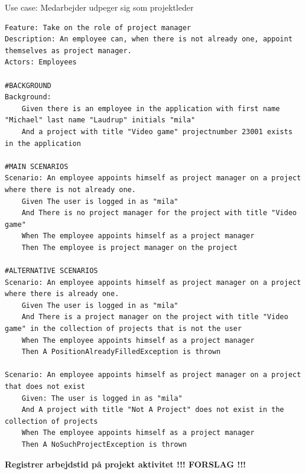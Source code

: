 \begin{listing}[H]
    \centering
    \caption{Use case: Medarbejder udpeger sig som projektleder} \label{lst:usecase_bliv_projektleder}
    \begin{verbatim}  
Feature: Take on the role of project manager
Description: An employee can, when there is not already one, appoint themselves as project manager.
Actors: Employees

#BACKGROUND
Background:
    Given there is an employee in the application with first name "Michael" last name "Laudrup" initials "mila"
    And a project with title "Video game" projectnumber 23001 exists in the application

#MAIN SCENARIOS
Scenario: An employee appoints himself as project manager on a project where there is not already one.
    Given The user is logged in as "mila"
    And There is no project manager for the project with title "Video game"
    When The employee appoints himself as a project manager
    Then The employee is project manager on the project

#ALTERNATIVE SCENARIOS
Scenario: An employee appoints himself as project manager on a project where there is already one.
    Given The user is logged in as "mila"
    And There is a project manager on the project with title "Video game" in the collection of projects that is not the user
    When The employee appoints himself as a project manager
    Then A PositionAlreadyFilledException is thrown

Scenario: An employee appoints himself as project manager on a project that does not exist
    Given: The user is logged in as "mila"
    And A project with title "Not A Project" does not exist in the collection of projects
    When The employee appoints himself as a project manager
    Then A NoSuchProjectException is thrown
    \end{verbatim}
\end{listing}\newpage
\textbf{Registrer arbejdstid på projekt aktivitet !!! FORSLAG !!!}
